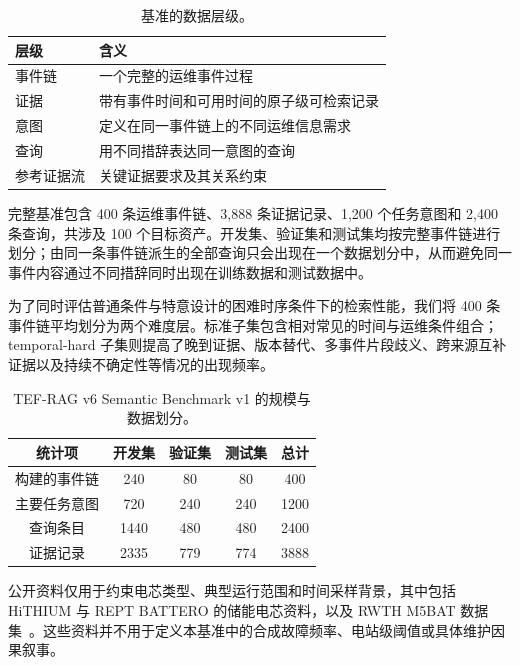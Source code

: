\begin{table}[t]
\caption{基准的数据层级。}
\label{tab:dataset_structure}
\centering
\small
\begin{tabular}{@{}>{\centering\arraybackslash}p{}>{\centering\arraybackslash}p{}@{}}
\toprule
层级 & 含义 \\
\midrule
事件链 & 一个完整的运维事件过程 \\
证据 & 带有事件时间和可用时间的原子级可检索记录 \\
意图 & 定义在同一事件链上的不同运维信息需求 \\
查询 & 用不同措辞表达同一意图的查询 \\
参考证据流 & 关键证据要求及其关系约束 \\
\bottomrule
\end{tabular}
\end{table}

完整基准包含 400 条运维事件链、3,888 条证据记录、1,200 个任务意图和 2,400 条查询，共涉及 100 个目标资产。开发集、验证集和测试集均按完整事件链进行划分；由同一条事件链派生的全部查询只会出现在一个数据划分中，从而避免同一事件内容通过不同措辞同时出现在训练数据和测试数据中。

为了同时评估普通条件与特意设计的困难时序条件下的检索性能，我们将 400 条事件链平均划分为两个难度层。标准子集包含相对常见的时间与运维条件组合；temporal-hard 子集则提高了晚到证据、版本替代、多事件片段歧义、跨来源互补证据以及持续不确定性等情况的出现频率。

\begin{table}[t]
\caption{TEF-RAG v6 Semantic Benchmark v1 的规模与数据划分。}
\label{tab:dataset_stats}
\centering
\small
\begin{tabular}{ccccc}
\toprule
统计项 & 开发集 & 验证集 & 测试集 & 总计 \\
\midrule
构建的事件链 & 240 & 80 & 80 & 400 \\
主要任务意图 & 720 & 240 & 240 & 1200 \\
查询条目 & 1440 & 480 & 480 & 2400 \\
证据记录 & 2335 & 779 & 774 & 3888 \\
\bottomrule
\end{tabular}
\end{table}

公开资料仅用于约束电芯类型、典型运行范围和时间采样背景，其中包括 HiTHIUM 与 REPT BATTERO 的储能电芯资料，以及 RWTH M5BAT 数据集~\cite{hithium2023v11,hithium2024v33,rept2025,rwth2026m5bat}。这些资料并不用于定义本基准中的合成故障频率、电站级阈值或具体维护因果叙事。


